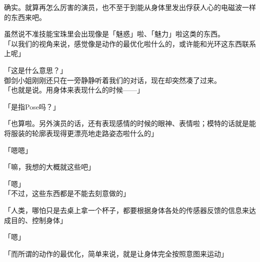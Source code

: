 确实。就算再怎么厉害的演员，也不至于到能从身体里发出俘获人心的电磁波一样的东西来吧。

虽然说不准技能宝珠里会出现像是「魅惑」啦、「魅力」啦这类的东西。\\

「以我们的视角来说，感觉像是动作的最优化啦什么的，或许能和光环这东西联系上呢」

「这是什么意思？」\\

御剑小姐刚刚还只在一旁静静听着我们的对话，现在却突然凑了过来。\\

「也就是说。用身体来表现什么的时候——」

「是指Pose吗？」

「也算啦。另外演员的话，还有表现感情的时候的眼神、表情啦；模特的话就是能将服装的轮廓表现得更漂亮地走路姿态啦什么的」

「嗯嗯」

「嘛，我想的大概就这些吧」

「嗯」\\

「不过，这些东西都是不能去刻意做的」

「人类，哪怕只是去桌上拿一个杯子，都要根据身体各处的传感器反馈的信息来达成目的、控制身体」

「嗯」

「而所谓的动作的最优化，简单来说，就是让身体完全按照意图来运动」

